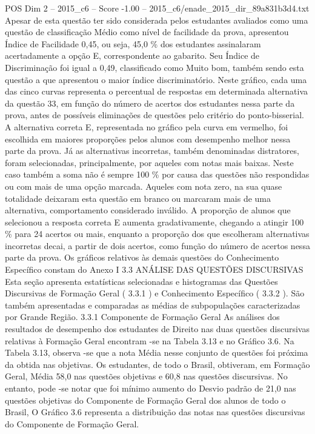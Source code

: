 \begin{textsample}{POS Dim 2 – 2015\_c6 – Score -1.00 – 2015\_c6/enade\_2015\_dir\_89a831b3d4.txt}
Apesar de esta questão ter sido considerada pelos estudantes avaliados como uma questão de classificação Médio como nível de facilidade da prova, apresentou Índice de Facilidade 0,45, ou seja, 45,0 \% dos estudantes assinalaram acertadamente a opção E, correspondente ao gabarito.
Seu Índice de Discriminação foi igual a 0,49, classificado como Muito bom, também sendo esta questão a que apresentou o maior índice discriminatório.
Neste gráfico, cada uma das cinco curvas representa o percentual de respostas em determinada alternativa da questão 33, em função do número de acertos dos estudantes nessa parte da prova, antes de possíveis eliminações de questões pelo critério do ponto-bisserial.
A alternativa correta E, representada no gráfico pela curva em vermelho, foi escolhida em maiores proporções pelos alunos com desempenho melhor nessa parte da prova.
Já as alternativas incorretas, também denominadas distratores, foram selecionadas, principalmente, por aqueles com notas mais baixas.
Neste caso também a soma não é sempre 100 \% por causa das questões não respondidas ou com mais de uma opção marcada.
Aqueles com nota zero, na sua quase totalidade deixaram esta questão em branco ou marcaram mais de uma alternativa, comportamento considerado inválido.
A proporção de alunos que selecionou a resposta correta E aumenta gradativamente, chegando a atingir 100 \% para 24 acertos ou mais, enquanto a proporção dos que escolheram alternativas incorretas decai, a partir de dois acertos, como função do número de acertos nessa parte da prova.
Os gráficos relativos às demais questões do Conhecimento Específico constam do Anexo I 3.3 ANÁLISE DAS QUESTÕES DISCURSIVAS Esta seção apresenta estatísticas selecionadas e histogramas das Questões Discursivas de Formação Geral ( 3.3.1 ) e Conhecimento Específico ( 3.3.2 ).
São também apresentadas e comparadas as médias de subpopulações caracterizadas por Grande Região. 3.3.1 Componente de Formação Geral As análises dos resultados de desempenho dos estudantes de Direito nas duas questões discursivas relativas à Formação Geral encontram -se na Tabela 3.13 e no Gráfico 3.6.
Na Tabela 3.13, observa -se que a nota Média nesse conjunto de questões foi próxima da obtida nas objetivas.
Os estudantes, de todo o Brasil, obtiveram, em Formação Geral, Média 58,0 nas questões objetivas e 60,8 nas questões discursivas.
No entanto, pode -se notar que foi mínimo aumento do Desvio padrão de 21,0 nas questões objetivas do Componente de Formação Geral dos alunos de todo o Brasil, O Gráfico 3.6 representa a distribuição das notas nas questões discursivas do Componente de Formação Geral.

\end{textsample}
